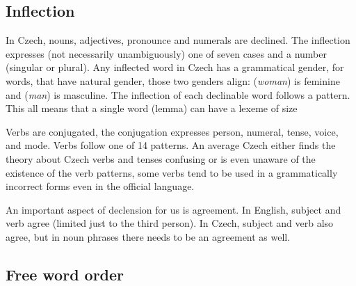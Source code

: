 \subsection{Inflection}
In Czech, nouns, adjectives, pronounce and numerals are declined. The inflection expresses (not necessarily unambiguously) one of seven cases and a number (singular or plural). Any inflected word in Czech has a grammatical gender, for words, that have natural gender, those two genders align:  (\textit{woman}) is feminine and  (\textit{man}) is masculine. The inflection of each declinable word follows a pattern. This all means that a single word (lemma) can have a lexeme of size 

Verbs are conjugated, the conjugation expresses person, numeral, tense, voice, and mode. Verbs follow one of 14 patterns. An average Czech either finds the theory about Czech verbs and tenses confusing or is even unaware of the existence of the verb patterns, some verbs tend to be used in a grammatically incorrect forms even in the official language.

An important aspect of declension for us is agreement. In English, subject and verb agree (limited just to the third person). In Czech, subject and verb also agree, but in noun phrases there needs to be an agreement as well.  

\subsection{Free word order}

